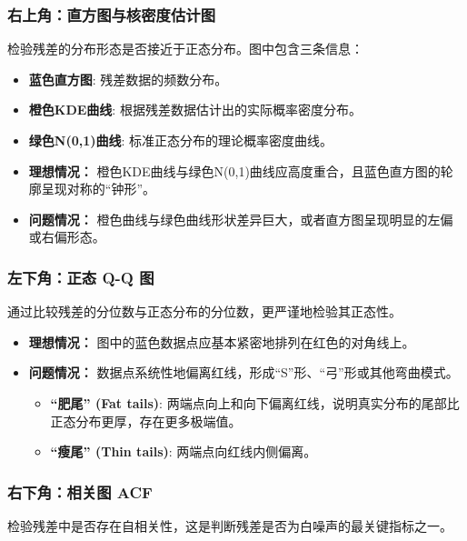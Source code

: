 \subsubsection*{右上角：直方图与核密度估计图}

检验残差的分布形态是否接近于正态分布。图中包含三条信息：
\begin{itemize}
    \item \textbf{蓝色直方图}: 残差数据的频数分布。
    \item \textbf{橙色KDE曲线}: 根据残差数据估计出的实际概率密度分布。
    \item \textbf{绿色N(0,1)曲线}: 标准正态分布的理论概率密度曲线。
\end{itemize}
\begin{itemize}
    \item \textbf{理想情况：} 橙色KDE曲线与绿色N(0,1)曲线应高度重合，且蓝色直方图的轮廓呈现对称的“钟形”。
    \item \textbf{问题情况：} 橙色曲线与绿色曲线形状差异巨大，或者直方图呈现明显的左偏或右偏形态。
\end{itemize}

\subsubsection*{左下角：正态 Q-Q 图}

通过比较残差的分位数与正态分布的分位数，更严谨地检验其正态性。

\begin{itemize}
    \item \textbf{理想情况：} 图中的蓝色数据点应基本紧密地排列在红色的对角线上。
    \item \textbf{问题情况：} 数据点系统性地偏离红线，形成“S”形、“弓”形或其他弯曲模式。
          \begin{itemize}
              \item \textbf{“肥尾” (Fat tails)}: 两端点向上和向下偏离红线，说明真实分布的尾部比正态分布更厚，存在更多极端值。
              \item \textbf{“瘦尾” (Thin tails)}: 两端点向红线内侧偏离。
          \end{itemize}
\end{itemize}

\subsubsection*{右下角：相关图 ACF}

检验残差中是否存在自相关性，这是判断残差是否为白噪声的最关键指标之一。

